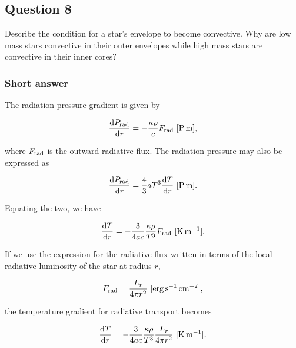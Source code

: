 \documentclass[a4paper,10pt]{article}
\begin{document}

\newpage
\subsection{Question 8}

Describe the condition for a star's envelope to become convective. Why are low mass stars convective in their outer envelopes while high mass stars are convective in their inner cores?

\subsubsection{Short answer}

The radiation pressure gradient is given by 

\begin{align*}
    \frac{{\rm d}P_{\rm rad}}{{\rm d}r} = -\frac{\kappa\rho}{c}F_{\rm rad} ~ [{\rm P\,m}],
\end{align*}

{\noindent}where $F_{\rm rad}$ is the outward radiative flux. The radiation pressure may also be expressed as

\begin{align*}
    \frac{{\rm d}P_{\rm rad}}{{\rm d}r} = \frac{4}{3} aT^3 \frac{{\rm d}T}{{\rm d}r} ~ [{\rm P\,m}].
\end{align*}

{\noindent}Equating the two, we have

\begin{align*}
    \frac{{\rm d}T}{{\rm d}r} = -\frac{3}{4ac}\frac{\kappa\rho}{T^3}F_{\rm rad} ~ [{\rm K\,m^{-1}}].
\end{align*}

{\noindent}If we use the expression for the radiative flux written in terms of the local radiative luminosity of the star at radius $r$, 

\begin{align*}
    F_{\rm rad} = \frac{L_r}{4\pi r^2} ~ [{\rm erg\,s^{-1}\,cm^{-2}}],
\end{align*}

{\noindent}the temperature gradient for radiative transport becomes

\begin{align*}
    \frac{{\rm d}T}{{\rm d}r} = -\frac{3}{4ac}\frac{\kappa\rho}{T^3}\frac{L_r}{4\pi r^2} ~ [{\rm K\,m^{-1}}].
\end{align*}
\end{document}
